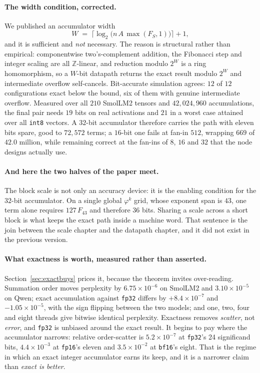 \documentclass[11pt]{article}
\theoremstyle{definition}
\begin{document}
\paragraph{The width condition, corrected.} We published an accumulator width
\[
  W \;=\; \bigl\lceil \log_{2}\bigl(n\,A\,\max(F_S,1)\bigr) \bigr\rceil + 1 ,
\]
and it is sufficient and \emph{not} necessary. The reason is structural rather
than empirical:
componentwise two's-complement addition, the Fibonacci step and integer scaling
are all $\mathbb{Z}$-linear, and reduction modulo $2^{W}$ is a ring
homomorphism, so a $W$-bit datapath returns the exact result modulo $2^{W}$ and
intermediate overflow self-cancels. Bit-accurate simulation agrees: $12$ of
$12$ configurations exact below the bound, six of them with genuine
intermediate overflow. Measured over all $210$ SmolLM2 tensors and
$42{,}024{,}960$ accumulations, the final pair needs $19$ bits on real
activations and $21$ in a worst case attained over all \texttt{int8} vectors.
A $32$-bit accumulator therefore carries the path with eleven bits spare, good
to $72{,}572$ terms; a $16$-bit one fails at fan-in $512$, wrapping $669$ of
$42.0$ million, while remaining correct at the fan-ins of $8$, $16$ and $32$
that the node designs actually use.

\paragraph{And here the two halves of the paper meet.} The block scale is not
only an accuracy device: it is the enabling condition for the $32$-bit
accumulator. On a single global $\varphi^{k}$ grid, whose exponent span is
$43$, one term alone requires $127\,F_{43}$ and therefore $36$ bits. Sharing a
scale across a short block is what keeps the exact path inside a machine word.
That sentence is the join between the scale chapter and the datapath chapter,
and it did not exist in the previous version.

\paragraph{What exactness is worth, measured rather than asserted.}
Section~\ref{sec:exactbuys} prices it, because the theorem invites over-reading.
Summation order moves perplexity by $6.75\times10^{-6}$ on SmolLM2 and
$3.10\times10^{-5}$ on Qwen; exact accumulation against \texttt{fp32} differs
by $+8.4\times10^{-7}$ and $-1.05\times10^{-5}$, with the sign flipping between
the two models; and one, two, four and eight threads give bitwise identical
perplexity. Exactness removes \emph{scatter}, not \emph{error}, and
\texttt{fp32} is unbiased around the exact result. It begins to pay where the
accumulator narrows: relative order-scatter is $5.2\times10^{-7}$ at
\texttt{fp32}'s 24 significand bits, $4.4\times10^{-3}$ at \texttt{fp16}'s
eleven and $3.5\times10^{-2}$ at \texttt{bf16}'s eight. That is the regime in
which an exact integer accumulator earns its keep, and it is a narrower claim
than \emph{exact is better}.
\end{document}
